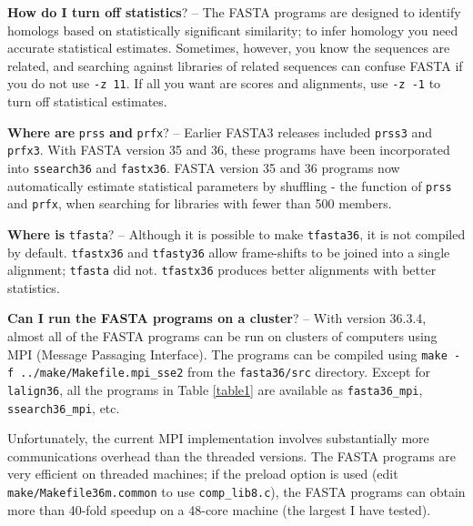\documentclass[11pt]{article}
\begin{document}
\vspace{0.5ex} {\noindent}\textbf{How do I turn off statistics}? --
The FASTA programs are designed to identify homologs based on
statistically significant similarity; to infer homology you need
accurate statistical estimates.  Sometimes, however, you know the
sequences are related, and searching against libraries of related
sequences can confuse FASTA if you do not use \texttt{-z 11}. If all
you want are scores and alignments, use \texttt{-z -1} to turn off
statistical estimates.

\vspace{0.5ex}
{\noindent}\textbf{Where are} \texttt{prss} {\noindent}\textbf{and} \texttt{prfx}? -- Earlier FASTA3
releases included \texttt{prss3} and \texttt{prfx3}. With FASTA
version 35 and 36, these programs have been incorporated into
\texttt{ssearch36} and \texttt{fastx36}.  FASTA version 35 and 36
programs now automatically estimate statistical parameters by
shuffling - the function of \texttt{prss} and \texttt{prfx}, when
searching for libraries with fewer than 500 members.

\vspace{0.5ex}
{\noindent}\textbf{Where is} \texttt{tfasta}? -- Although it is possible to make
\texttt{tfasta36}, it is not compiled by default.  \texttt{tfastx36}
and \texttt{tfasty36} allow frame-shifts to be joined into a single
alignment; \texttt{tfasta} did not. \texttt{tfastx36} produces better
alignments with better statistics.

\vspace{0.5ex}
{\noindent}\textbf{Can I run the FASTA programs on a cluster}? -- With version
36.3.4, almost all of the FASTA programs can be run on clusters of
computers using MPI (Message Passaging Interface).  The programs can
be compiled using \texttt{make -f ../make/Makefile.mpi\_sse2} from the
\texttt{fasta36/src} directory.  Except for \texttt{lalign36}, all the
programs in Table \ref{table1} are available as \texttt{fasta36\_mpi},
\texttt{ssearch36\_mpi}, etc.

Unfortunately, the current MPI implementation involves substantially
more communications overhead than the threaded versions.  The FASTA
programs are very efficient on threaded machines; if the preload
option is used (edit \texttt{make/Makefile36m.common} to use
\texttt{comp\_lib8.c}), the FASTA programs can obtain more than 40-fold speedup on a 48-core machine (the largest I have tested). 
\end{document}
